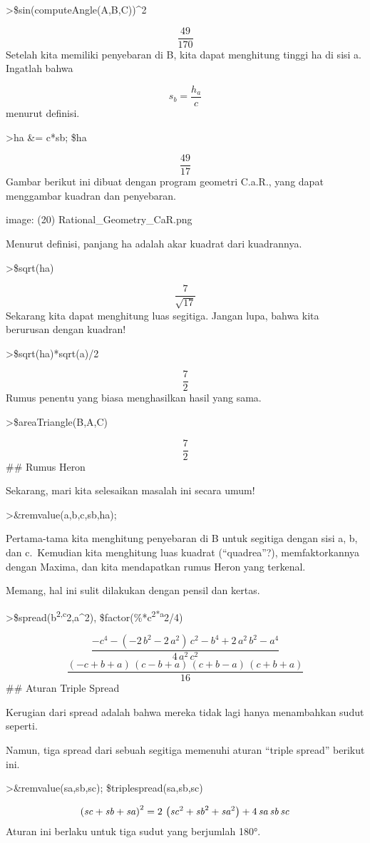 \documentclass[
]{book}
\begin{document}
\textgreater\$sin(computeAngle(A,B,C))\^{}2

\[\frac{49}{170}\]Setelah kita memiliki penyebaran di B, kita dapat menghitung tinggi ha di sisi a. Ingatlah bahwa

\[s_b = \frac{h_a}{c}\]menurut definisi.

\textgreater ha \&= c*sb; \$ha

\[\frac{49}{17}\]Gambar berikut ini dibuat dengan program geometri C.a.R., yang dapat menggambar kuadran dan penyebaran.

image: (20) Rational\_Geometry\_CaR.png

Menurut definisi, panjang ha adalah akar kuadrat dari kuadrannya.

\textgreater\$sqrt(ha)

\[\frac{7}{\sqrt{17}}\]Sekarang kita dapat menghitung luas segitiga. Jangan lupa, bahwa kita berurusan dengan kuadran!

\textgreater\$sqrt(ha)*sqrt(a)/2

\[\frac{7}{2}\]Rumus penentu yang biasa menghasilkan hasil yang sama.

\textgreater\$areaTriangle(B,A,C)

\[\frac{7}{2}\]\#\# Rumus Heron

Sekarang, mari kita selesaikan masalah ini secara umum!

\textgreater\&remvalue(a,b,c,sb,ha);

Pertama-tama kita menghitung penyebaran di B untuk segitiga dengan sisi a, b, dan c.~Kemudian kita menghitung luas kuadrat (``quadrea''?), memfaktorkannya dengan Maxima, dan kita mendapatkan rumus Heron yang terkenal.

Memang, hal ini sulit dilakukan dengan pensil dan kertas.

\textgreater\$spread(b\textsuperscript{2,c}2,a\^{}2), \$factor(\%*c\textsuperscript{2*a}2/4)

\[\frac{-c^4-\left(-2\,b^2-2\,a^2\right)\,c^2-b^4+2\,a^2\,b^2-a^4}{4
 \,a^2\,c^2}\]\[\frac{\left(-c+b+a\right)\,\left(c-b+a\right)\,\left(c+b-a\right)\,
 \left(c+b+a\right)}{16}\]\#\# Aturan Triple Spread

Kerugian dari spread adalah bahwa mereka tidak lagi hanya menambahkan sudut seperti.

Namun, tiga spread dari sebuah segitiga memenuhi aturan ``triple spread'' berikut ini.

\textgreater\&remvalue(sa,sb,sc); \$triplespread(sa,sb,sc)

\[\left({\it sc}+{\it sb}+{\it sa}\right)^2=2\,\left({\it sc}^2+
 {\it sb}^2+{\it sa}^2\right)+4\,{\it sa}\,{\it sb}\,{\it sc}\]Aturan ini berlaku untuk tiga sudut yang berjumlah 180°.
\end{document}
